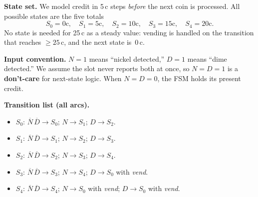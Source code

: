 \documentclass[12pt, letterpaper]{article}
\begin{document}
\textbf{State set.}  We model credit in 5\,c steps \emph{before} the next coin is processed.
All possible states are the five totals
\[
  S_0{=}0\text{c},\quad S_1{=}5\text{c},\quad S_2{=}10\text{c},\quad S_3{=}15\text{c},\quad
  S_4{=}20\text{c}.
\]
No state is needed for 25\,c as a steady value: vending is handled on the transition that
reaches $\geq 25$\,c, and the next state is~$0$\,c.

\textbf{Input convention.}  $N{=}1$ means ``nickel detected,'' $D{=}1$ means ``dime
detected.''  We assume the slot never reports both at once, so $N{=}D{=}1$ is a
\textbf{don't-care} for next-state logic.  When $N{=}D{=}0$, the FSM holds its present credit.

\textbf{Transition list (all arcs).}
\begin{itemize}
  \item $S_0$: $\overline{N}\,\overline{D}\to S_0$;\; $N\to S_1$;\; $D\to S_2$.
  \item $S_1$: $\overline{N}\,\overline{D}\to S_1$;\; $N\to S_2$;\; $D\to S_3$.
  \item $S_2$: $\overline{N}\,\overline{D}\to S_2$;\; $N\to S_3$;\; $D\to S_4$.
  \item $S_3$: $\overline{N}\,\overline{D}\to S_3$;\; $N\to S_4$;\; $D\to S_0$ with \textit{vend}.
  \item $S_4$: $\overline{N}\,\overline{D}\to S_4$;\; $N\to S_0$ with \textit{vend};\;
        $D\to S_0$ with \textit{vend}.
\end{itemize}
\end{document}
